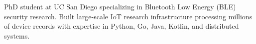 PhD student at UC San Diego specializing in Bluetooth Low Energy (BLE) security research. Built large-scale IoT research infrastructure processing millions of device records with expertise in Python, Go, Java, Kotlin, and distributed systems.
